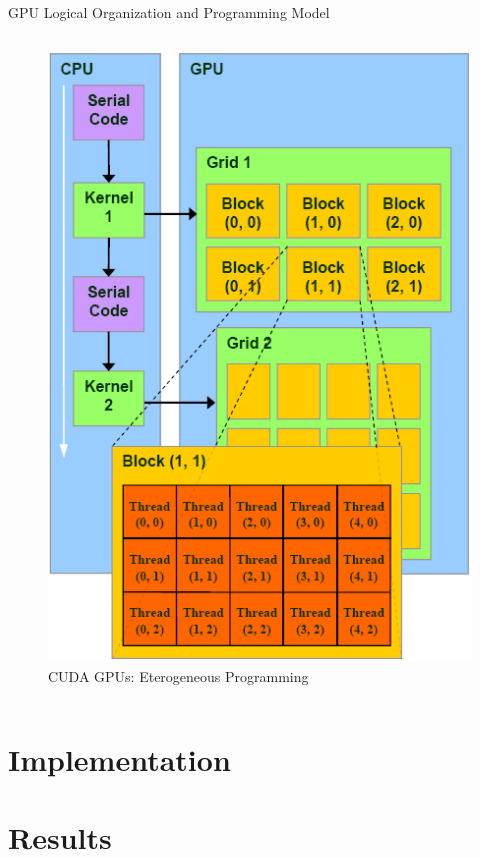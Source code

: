\documentclass[10pt, red]{beamer}
\begin{document}
\begin{frame}{GPU Logical Organization and Programming Model}
\begin{columns}
\begin{figure}
				\includegraphics[width=\textwidth, height=0.6\textheight]{img/nVidiaExecutionModel}
				\caption{CUDA GPUs: Eterogeneous Programming}
			\end{figure}
		\end{columns}
	\end{frame}


\section{Implementation}
	\begin{frame}{3}
	\end{frame}


\section{Results}
\end{document}
